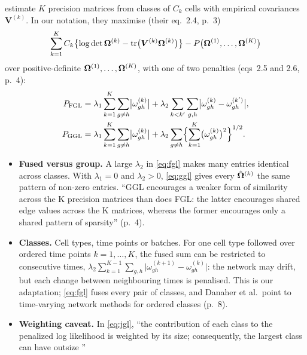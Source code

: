 \documentclass[11pt,a4paper]{article}
\begin{document}
\begin{methodbox}[title={Joint graphical lasso: group versus fused penalty}]
\textcite{danaherJointGraphicalLasso2012} estimate $K$ precision matrices from classes of $C_k$ cells with
empirical covariances $\bm V^{(k)}$. In our notation, they maximise (their eq.~2.4, p.~3)
\begin{equation}\label{eq:jgl}
\sum_{k=1}^KC_k\bigl\{\log\det\bm{\Omega}^{(k)}-\operatorname{tr}\bigl(\bm V^{(k)}\bm{\Omega}^{(k)}\bigr)\bigr\}
-P\bigl(\bm{\Omega}^{(1)},\dots,\bm{\Omega}^{(K)}\bigr)
\end{equation}
over positive-definite $\bm{\Omega}^{(1)},\dots,\bm{\Omega}^{(K)}$, with one of two penalties (eqs~2.5 and 2.6,
p.~4):
\begin{align}
P_{\mathrm{FGL}}&=\lambda_1\sum_{k=1}^K\sum_{g\neq h}\bigl\lvert\omega^{(k)}_{gh}\bigr\rvert
  +\lambda_2\sum_{k<k'}\sum_{g,h}\bigl\lvert\omega^{(k)}_{gh}-\omega^{(k')}_{gh}\bigr\rvert,
  \label{eq:fgl}\\
P_{\mathrm{GGL}}&=\lambda_1\sum_{k=1}^K\sum_{g\neq h}\bigl\lvert\omega^{(k)}_{gh}\bigr\rvert
  +\lambda_2\sum_{g\neq h}\Bigl\{\sum_{k=1}^K\bigl(\omega^{(k)}_{gh}\bigr)^2\Bigr\}^{1/2}.
  \label{eq:ggl}
\end{align}
\begin{itemize}
  \item \textbf{Fused versus group.} A large $\lambda_2$ in \eqref{eq:fgl} makes many entries identical
        across classes. With $\lambda_1=0$ and $\lambda_2>0$, \eqref{eq:ggl} gives every
        $\hat{\bm{\Omega}}^{(k)}$ the same pattern of non-zero entries. \enquote{GGL encourages a weaker form of
        similarity across the K precision matrices than does FGL: the latter encourages shared edge values
        across the K matrices, whereas the former encourages only a shared pattern of sparsity} (p.~4).
  \item \textbf{Classes.} Cell types, time points or batches. For one cell type followed over ordered
        time points $k=1,\dots,K$, the fused sum can be restricted to consecutive times,
        $\lambda_2\sum_{k=1}^{K-1}\sum_{g,h}\lvert\omega^{(k+1)}_{gh}-\omega^{(k)}_{gh}\rvert$: the
        network may drift, but each change between neighbouring times is penalised. This is our
        adaptation; \eqref{eq:fgl} fuses every pair of classes, and Danaher et al.\ point to time-varying
        network methods for ordered classes (p.~8).
  \item \textbf{Weighting caveat.} In \eqref{eq:jgl}, \enquote{the contribution of each class to the
        penalized log likelihood is weighted by its size; consequently, the largest class can have outsize
}
\end{itemize}
\end{methodbox}
\end{document}
